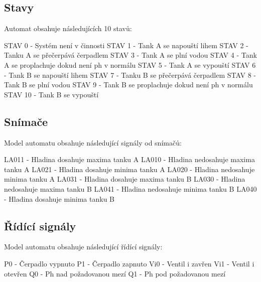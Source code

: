 \documentclass[12pt, a4paper]{article}
\begin{document}
\subsection{Stavy}
Automat obsahuje následujících 10 stavů:

STAV 0 - Systém není v činnosti \newline 
STAV 1 - Tank A se napouští lihem \newline 
STAV 2 - Tanku A se přečerpává čerpadlem \newline 
STAV 3 - Tank A se plní vodou \newline 
STAV 4 - Tank A se proplachuje dokud není ph v normálu \newline 
STAV 5 - Tank A se vypouští \newline 
STAV 6 - Tank B se napouští lihem \newline 
STAV 7 - Tanku B se přečerpává čerpadlem \newline 
STAV 8 - Tank B se plní vodou \newline 
STAV 9 - Tank B se proplachuje dokud není ph v normálu \newline 
STAV 10 - Tank B se vypouští 

\subsection{Snímače}
Model automatu obsahuje následující signály od snímačů:
 
LA011 - Hladina dosahuje maxima tanku A \newline 
LA010 - Hladina nedosahuje maxima tanku A \newline 
LA021 - Hladina dosahuje minima tanku A \newline 
LA020 - Hladina nedosahuje minima tanku A \newline 
LA031 - Hladina dosahuje maxima tanku B \newline
LA030 - Hladina nedosahuje maxima tanku B \newline 
LA041 - Hladina nedosahuje minima tanku B \newline 
LA040 - Hladina dosahuje minima tanku B

\subsection{Řídící signály}
Model automatu obsahuje následující řídící signály:

P0 - Čerpadlo vypnuto \newline 
P1 - Čerpadlo zapnuto \newline 
Vi0 - Ventil i zavřen \newline 
Vi1 - Ventil i otevřen \newline 
Q0 - Ph nad požadovanou mezí \newline 
Q1 - Ph pod požadovanou mezí 
\end{document}
